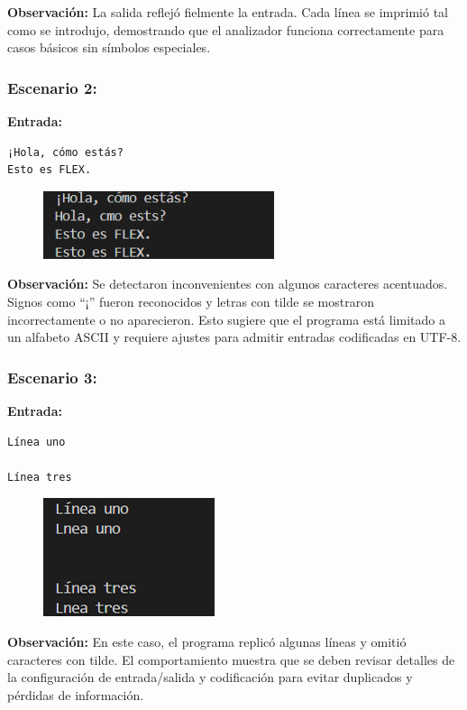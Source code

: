 \documentclass{article}
\begin{document}
\textbf{Observación:}  
La salida reflejó fielmente la entrada. Cada línea se imprimió tal como se introdujo, demostrando que el analizador funciona correctamente para casos básicos sin símbolos especiales.

\subsubsection{Escenario 2: }

\textbf{Entrada:}  
\begin{verbatim}
¡Hola, cómo estás?
Esto es FLEX.
\end{verbatim}

\begin{figure}[H]
    \centering
    \includegraphics[width=0.5\linewidth]{image2.png}
\end{figure}

\textbf{Observación:}  
Se detectaron inconvenientes con algunos caracteres acentuados. Signos como ``¡'' fueron reconocidos y letras con tilde se mostraron incorrectamente o no aparecieron. Esto sugiere que el programa está limitado a un alfabeto ASCII y requiere ajustes para admitir entradas codificadas en UTF-8.

\subsubsection{Escenario 3: }

\textbf{Entrada:}  
\begin{verbatim}
Línea uno

Línea tres
\end{verbatim}
\begin{figure}[H]
    \centering
    \includegraphics[width=0.5\linewidth]{image3.png}
\end{figure}
\textbf{Observación:}  
En este caso, el programa replicó algunas líneas y omitió caracteres con tilde. El comportamiento muestra que se deben revisar detalles de la configuración de entrada/salida y codificación para evitar duplicados y pérdidas de información.
\end{document}
